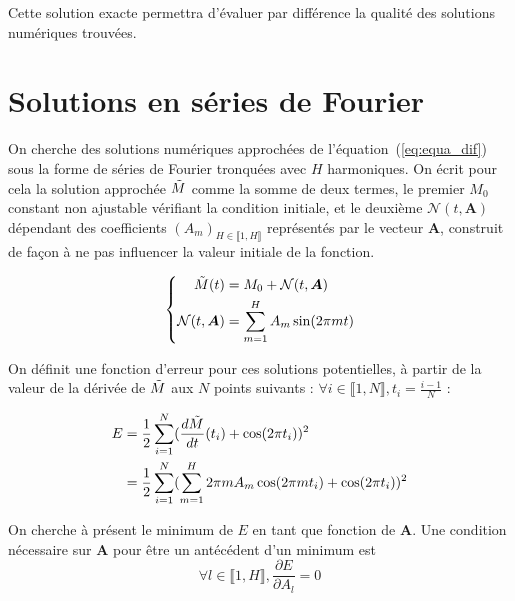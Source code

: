 \documentclass[12pt]{report}
\begin{document}
Cette solution exacte permettra d'évaluer par différence la qualité des solutions numériques trouvées.

\section{Solutions en séries de Fourier}
\label{sec:sol_ser_fourier_1d}

On cherche des solutions numériques approchées de l'équation~(\ref{eq:equa_dif}) sous la forme de séries de Fourier tronquées avec $H$ harmoniques.
On écrit pour cela la solution approchée $\Tilde{M}$ comme la somme de deux termes, le premier $M_0$ constant non ajustable vérifiant la condition initiale, et le deuxième $\mathcal{N}(t,\bm{A})$ dépendant des coefficients $(A_m)_{H\in \llbracket 1,H \rrbracket}$ représentés par le vecteur $\bm{A}$, construit de façon à ne pas influencer la valeur initiale de la fonction.

\begin{equation}
    \left\{
    \begin{aligned}
        \Tilde{M}(t)            & = M_0 + {\mathcal{N}}(t,\bm{A})     \\
        {\mathcal{N}}(t,\bm{A}) & = \sum_{m=1}^{H} A_m \sin(2\pi m t)
    \end{aligned}
    \right.
    \label{eq:solution_fourier}
\end{equation}

On définit une fonction d'erreur pour ces solutions potentielles, à partir de la valeur de la dérivée de $\Tilde{M}$ aux $N$ points suivants : $\forall i \in\llbracket 1,N \rrbracket, t_i = \frac{i-1}{N} $ :

\begin{equation}
    \begin{aligned}
        E & = \frac{1}{2}\sum_{i=1}^{N} (\frac{d\Tilde{M}}{dt}(t_i) +\cos(2\pi t_i))^2               \\
          & = \frac{1}{2}\sum_{i=1}^{N}(\sum_{m=1}^{H} 2\pi m A_m \cos(2\pi m t_i)+\cos(2\pi t_i))^2
    \end{aligned}
    \label{eq:fonction_erreur}
\end{equation}

On cherche à présent le minimum de $E$ en tant que fonction de $\bm{A}$.
Une condition nécessaire sur $\bm{A}$ pour être un antécédent d'un minimum est
\begin{equation}
    {\forall l \in\llbracket 1,H \rrbracket, \frac{\partial E}{\partial A_l} = 0}
    \label{eq:condition_necessaire_A_l}
\end{equation}
\end{document}
